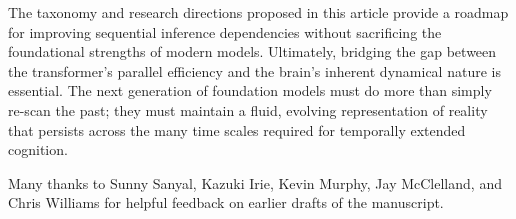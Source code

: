 \documentclass{llmxive}
\begin{document}
The taxonomy and research directions proposed in this article provide a roadmap 
for improving sequential inference dependencies without sacrificing the 
foundational strengths of modern models. Ultimately, bridging the gap between 
the transformer's parallel efficiency and the brain's inherent dynamical nature 
is essential. The next generation of foundation models must do more than simply 
re-scan the past; they must maintain a fluid, evolving representation of reality 
that persists across the many time scales required for temporally extended cognition.
\begin{ack}
Many thanks to Sunny Sanyal, Kazuki Irie, Kevin Murphy, Jay McClelland, and Chris Williams for helpful feedback on earlier drafts of the manuscript.
\end{ack}



\end{document}
